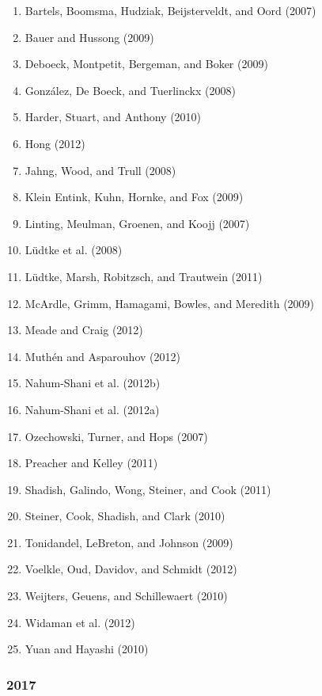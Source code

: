 \documentclass[english,man]{apa6}
\providecommand{\tightlist}{%
  \setlength{\itemsep}{0pt}\setlength{\parskip}{0pt}}
\begin{document}
\begin{enumerate}
\def\labelenumi{\arabic{enumi})}
\tightlist
\item
  Bartels, Boomsma, Hudziak, Beijsterveldt, and Oord (2007)
\item
  Bauer and Hussong (2009)
\item
  Deboeck, Montpetit, Bergeman, and Boker (2009)
\item
  González, De Boeck, and Tuerlinckx (2008)
\item
  Harder, Stuart, and Anthony (2010)
\item
  Hong (2012)
\item
  Jahng, Wood, and Trull (2008)
\item
  Klein Entink, Kuhn, Hornke, and Fox (2009)
\item
  Linting, Meulman, Groenen, and Koojj (2007)
\item
  Lüdtke et al. (2008)
\item
  Lüdtke, Marsh, Robitzsch, and Trautwein (2011)
\item
  McArdle, Grimm, Hamagami, Bowles, and Meredith (2009)
\item
  Meade and Craig (2012)
\item
  Muthén and Asparouhov (2012)
\item
  Nahum-Shani et al. (2012b)
\item
  Nahum-Shani et al. (2012a)
\item
  Ozechowski, Turner, and Hops (2007)
\item
  Preacher and Kelley (2011)
\item
  Shadish, Galindo, Wong, Steiner, and Cook (2011)
\item
  Steiner, Cook, Shadish, and Clark (2010)
\item
  Tonidandel, LeBreton, and Johnson (2009)
\item
  Voelkle, Oud, Davidov, and Schmidt (2012)
\item
  Weijters, Geuens, and Schillewaert (2010)
\item
  Widaman et al. (2012)
\item
  Yuan and Hayashi (2010)
\end{enumerate}

\subsubsection{2017}\label{section-35}
\end{document}
